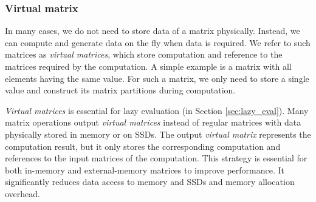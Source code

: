 \subsubsection{Virtual matrix} \label{virt_mat}
In many cases, we do not need to store data of a matrix physically. Instead,
we can compute and generate data on the fly when data is required. We refer
to such matrices as \textit{virtual matrices}, which store computation and
reference to the matrices required by the computation. A simple example is
a matrix with
all elements having the same value. For such a matrix, we only need to store
a single value and construct its matrix partitions during computation.

\textit{Virtual matrices} is essential for lazy evaluation (in Section
\ref{sec:lazy_eval}). Many matrix operations output \textit{virtual matrices}
instead of regular matrices with data physically stored in memory or on SSDs.
The output \textit{virtual matrix} represents the computation result, but it
only stores the corresponding computation and references to the input matrices
of the computation. This strategy is essential for both in-memory and
external-memory matrices to improve performance. It significantly reduces data
access to memory and SSDs and memory allocation overhead.




